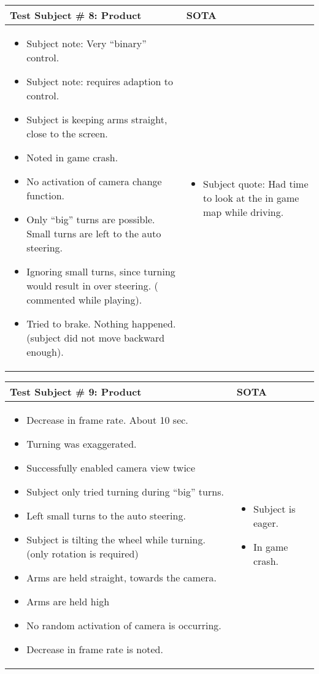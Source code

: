 \begin{table}[!htbp]
\centering
\begin{tabular}{| p{3.4in} | p{2in} |}
\hline
	\textbf{Test Subject \# 8: Product} & \textbf{SOTA}\\
\hline
	\begin{itemize}
		\item Subject note: Very “binary” control.
		\item Subject note: requires adaption to control.
		\item Subject is keeping arms straight, close to the screen.
		\item Noted in game crash.
		\item No activation of camera change function.
		\item Only “big” turns are possible. Small turns are left to the auto steering.
		\item Ignoring small turns, since turning would result in over steering. ( commented while playing).
		\item Tried to brake. Nothing happened. (subject did not move backward enough).
	\end{itemize}
	&
	\begin{itemize}
		\item Subject quote: Had time to look at the in game map while driving.
	\end{itemize}
	\\
\hline
\end{tabular}
\end{table}


\begin{table}[!htbp]
\centering
\begin{tabular}{| p{3.4in} | p{2in} |}
\hline
	\textbf{Test Subject \# 9: Product} & \textbf{SOTA}\\
\hline
	\begin{itemize}
		\item Decrease in frame rate. About 10 sec.
		\item Turning was exaggerated.
		\item Successfully enabled camera view twice
		\item Subject only tried turning during “big” turns.
		\item Left small turns to the auto steering.
		\item Subject is tilting the wheel while turning.(only rotation is required)
		\item Arms are held straight, towards the camera.
		\item Arms are held high
		\item No random activation of camera is occurring.
		\item Decrease in frame rate is noted.
	\end{itemize}
	&
	\begin{itemize}
		\item Subject is eager.
		\item In game crash.
	\end{itemize}
	\\
\hline
\end{tabular}
\end{table}


